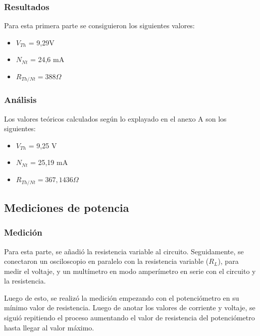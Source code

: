 \documentclass{article}
\begin{document}
            \subsubsection{Resultados}

                \quad Para esta primera parte se consiguieron los siguientes valores:
            	\begin{itemize}
                \item $V_{Th}$ = 9,29V
                \item $N_{Nt}$ = 24,6 mA
                \item $R_{Th/Nt} = 388  \Omega $
                \end{itemize}

            \subsubsection{Análisis}
            \quad Los valores teóricos calculados según lo explayado en el anexo A son los siguientes:
            	\begin{itemize}
                \item $V_{Th}$ = 9,25 V
                \item $N_{Nt}$ = 25,19 mA
                \item $R_{Th/Nt} = 367,1436  \Omega $
                \end{itemize}
        
        \subsection{Mediciones de potencia}

            \subsubsection{Medición}

            \quad Para esta parte, se añadió la resistencia variable al circuito. Seguidamente, se conectaron un osciloscopio en paralelo con la resistencia variable ($R_{L}$), para medir el voltaje, y un multímetro en modo amperímetro en serie con el circuito y la resistencia.\par
            Luego de esto, se realizó la medición empezando con el potenciómetro en su mínimo valor de resistencia. Luego de anotar los valores de corriente y voltaje, se siguió repitiendo el proceso aumentando el valor de resistencia del potenciómetro hasta llegar al valor máximo.\par
            
\end{document}
